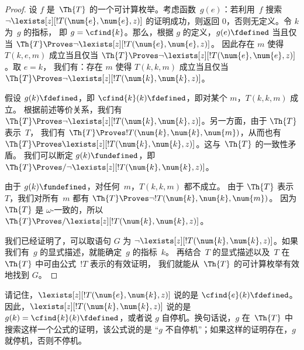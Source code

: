 \documentclass[../OpenLogic/include/open-logic-section]{subfiles}
\begin{document}
\begin{proof}
  设 $f$ 是~$\Th{T}$ 的一个可计算枚举。考虑函数~$g(e)$：若利用~$f$
  搜索 $\lnot\lexists[z][!T(\num{e}, \num{e}, z)]$ 的证明成功，则返回 $0$，否则无定义。令 $k$ 为~$g$ 的指标，
  即 $g = \cfind{k}$。那么，根据 $g$ 的定义，$g(e) \fdefined$ 当且仅当 $\Th{T} \Proves
  \lnot\lexists[z][!T(\num{e}, \num{e}, z)]$。
  因此存在 $m$ 使得 $T(k, e, m)$ 成立当且仅当 $\Th{T}
  \Proves \lnot\lexists[z][!T(\num{e}, \num{e}, z)]$。取 $e = k$，
  我们有：存在 $m$ 使得 $T(k, k, m)$ 成立当且仅当 $\Th{T}
  \Proves \lnot\lexists[z][!T(\num{k}, \num{k}, z)]$。

  假设 $g(k) \fdefined$，即 $\cfind{k}(k) \fdefined$，即对某个 $m$，$T(k, k, m)$ 成立。
  根据前述等价关系，我们有 $\Th{T} \Proves \lnot\lexists[z][!T(\num{k}, \num{k},
  z)]$。另一方面，由于 $\Th{T}$ 表示~$T$，
  我们有 $\Th{T} \Proves !T(\num{k}, \num{k}, \num{m})$，从而也有 $\Th{T}
  \Proves \lexists[z][!T(\num{k}, \num{k}, z)]$。这与~$\Th{T}$ 的一致性矛盾。
  我们可以断定 $g(k) \fundefined$，即 $\Th{T} \Proves/ \lnot\lexists[z][!T(\num{k}, \num{k}, z)]$。

  由于 $g(k) \fundefined$，对任何~$m$，$T(k, k, m)$ 都不成立。
  由于 $\Th{T}$ 表示~$T$，我们对所有~$m$ 都有 $\Th{T} \Proves \lnot
  !T(\num{k}, \num{k}, \num{m})$。
  因为 $\Th{T}$ 是 $\omega$-一致的，所以 $\Th{T} \Proves/ \lexists[z][!T(\num{k},
  \num{k}, z)]$。

  我们已经证明了，可以取语句 $G$ 为
  $\lnot\lexists[z][!T(\num{k}, \num{k}, z)]$。如果我们有~$g$ 的显式描述，就能确定~$g$ 的指标~$k$。
  再结合~$T$ 的显式描述以及~$T$ 在~$\Th{T}$ 中可由公式~$!T$ 表示的有效证明，
  我们就能从~$\Th{T}$ 的可计算枚举有效地找到 $G$。
\end{proof}

请记住，$\lexists[z][!T(\num{e}, \num{k}, z)]$ 说的是 $\cfind{e}(k)\fdefined$。因此，$\lexists[z][!T(\num{k},
\num{k}, z)]$ 说的是 $g(k) = \cfind{k}(k)\fdefined$，或者说
$g$ 自停机。换句话说，$g$ 在~$\Th{T}$ 中搜索这样一个公式的证明，该公式说的是
“$g$ 不自停机”；如果这样的证明存在，$g$ 就停机，否则不停机。
\end{document}

